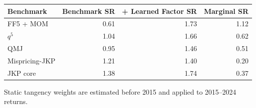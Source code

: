\begin{threeparttable}
\begin{tabular}{lrrr}
\toprule
Benchmark & Benchmark SR & + Learned Factor SR & Marginal SR \\
\midrule
FF5 + MOM & 0.61 & 1.73 & 1.12 \\
$q^5$ & 1.04 & 1.66 & 0.62 \\
QMJ & 0.95 & 1.46 & 0.51 \\
Mispricing-JKP & 1.21 & 1.40 & 0.20 \\
JKP core & 1.38 & 1.74 & 0.37 \\
\bottomrule
\end{tabular}
\begin{tablenotes}\footnotesize\item Static tangency weights are estimated before 2015 and applied to 2015--2024 returns.\end{tablenotes}
\end{threeparttable}
